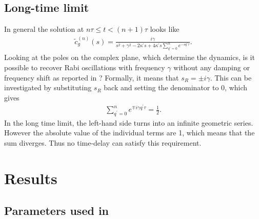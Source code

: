 \documentclass[11pt, a4paper]{article}
\def\qp{{q^\prime}}
\def\kappap{{\kappa^\prime}}
\def\ctil{\tilde{c}}
\begin{document}
\subsection{Long-time limit}
In general the solution at $n\tau\le t<(n+1)\tau$ looks like
\begin{align}
\ctil_g^{(n)}(s) = \frac{i\gamma}{s^2+\gamma^2-2\kappap s+4\kappap s\sum_{\qp=0}^{n}e^{-s\qp\tau}}.
\end{align}
Looking at the poles on the complex plane, which determine the dynamics, is it possible to recover Rabi oscillations with frequency $\gamma$ without any damping or frequency shift as reported in \cite{Kabuss2015}? Formally, it means that $s_R=\pm i\gamma$. This can be investigated by substituting $s_R$ back and setting the denominator to 0, which gives
\vspace{-.4cm}
\begin{align}
\sum_{\qp=0}^ne^{\mp i\gamma\qp\tau} = \frac{1}{2}.
\end{align}
In the long time limit, the left-hand side turns into an infinite geometric series. However the absolute value of the individual terms are 1, which means that the sum diverges. Thus no time-delay can satisfy this requirement.

\vspace{-.2cm}
\section{Results}
\subsection{Parameters used in \cite{Kabuss2015}}
\end{document}
